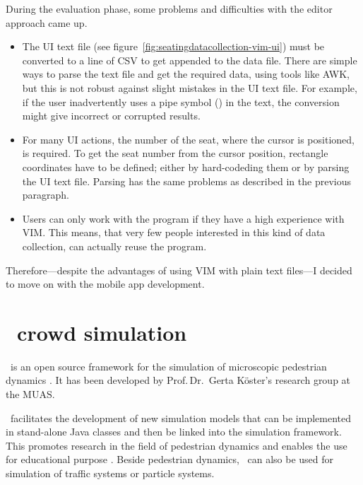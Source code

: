 During the evaluation phase, some problems and difficulties with the editor
approach came up.

\begin{itemize}

  \item The \acs{UI} text file (see
    figure~\ref{fig:seatingdatacollection-vim-ui}) must be converted to a line
    of \acs{CSV} to get appended to the data file.
    There are simple ways to parse the text file and get the required data,
    using tools like AWK, but this is not robust against slight mistakes in the
    \acs{UI} text file.
    For example, if the user inadvertently uses a pipe symbol (\code{|}) in the
    text, the conversion might give incorrect or corrupted results.

  \item For many \acs{UI} actions, the number of the seat, where the cursor is
    positioned, is required.
    To get the seat number from the cursor position, rectangle coordinates have
    to be defined;
    either by hard-codeding them or by parsing the \acs{UI} text file.
    Parsing has the same problems as described in the previous paragraph.

  \item Users can only work with the program if they have a high experience with
    VIM. This means, that very few people interested in this kind of data
    collection, can actually reuse the program.

\end{itemize}

Therefore---despite the advantages of using VIM with plain text files---I
decided to move on with the mobile app development.

\section{\vadere\ crowd simulation}

\vadere\ is an open source framework for the simulation of microscopic
pedestrian dynamics \citep{vadere2016:online}.
It has been developed by Prof.\,Dr.\ Gerta Köster's research group at the
\acl{MUAS}.

\vadere\ facilitates the development of new simulation models that can be
implemented in stand-alone Java classes and then be linked into the simulation
framework.
This promotes research in the field of pedestrian dynamics and enables the use
for educational purpose \citep{seitz-2016}.
Beside pedestrian dynamics, \vadere\ can also be used for simulation of traffic
systems or particle systems.

